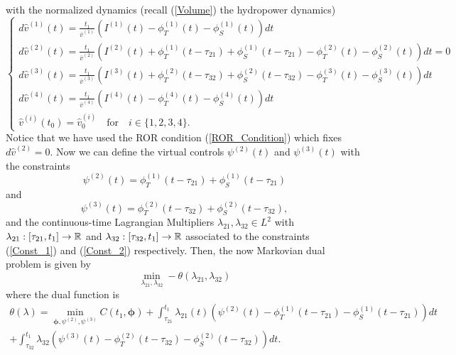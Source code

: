 with the normalized dynamics (recall (\ref{Volume}) the hydropower dynamics)
\begin{equation}
\begin{cases}
d\hat{v}^{(1)}(t)=\frac{t_1}{\overline{v}^{(1)}}\left(I^{(1)}(t)-\phi_T^{(1)}(t)-\phi_S^{(1)}(t)\right)dt\\
d\hat{v}^{(2)}(t)=\frac{t_1}{\overline{v}^{(2)}}\left(I^{(2)}(t)+\phi_T^{(1)}(t-\tau_{21})+\phi_S^{(1)}(t-\tau_{21})-\phi_T^{(2)}(t)-\phi_S^{(2)}(t)\right)dt=0\\
d\hat{v}^{(3)}(t)=\frac{t_1}{\overline{v}^{(3)}}\left(I^{(3)}(t)+\phi_T^{(2)}(t-\tau_{32})+\phi_S^{(2)}(t-\tau_{32})-\phi_T^{(3)}(t)-\phi_S^{(3)}(t)\right)dt\\
d\hat{v}^{(4)}(t)=\frac{t_1}{\overline{v}^{(4)}}\left(I^{(4)}(t)-\phi_T^{(4)}(t)-\phi_S^{(4)}(t)\right)dt\\
\hat{v}^{(i)}(t_0)=\hat{v}_0^{(i)}\quad\text{for}\quad i\in\{1,2,3,4\}.
\end{cases}
\label{Dynamics_Sixth_SP}
\end{equation}
Notice that we have used the ROR condition (\ref{ROR_Condition}) which fixes $d\hat{v}^{(2)}=0$. Now we can define the virtual controls $\psi^{(2)}(t)$ and $\psi^{(3)}(t)$ with the constraints
\begin{equation}
\psi^{(2)}(t)=\phi^{(1)}_T(t-\tau_{21})+\phi^{(1)}_S(t-\tau_{21})
\label{Const_1}
\end{equation}
and
\begin{equation}
\psi^{(3)}(t)=\phi^{(2)}_T(t-\tau_{32})+\phi^{(2)}_S(t-\tau_{32}),
\label{Const_2}
\end{equation}
and the continuous-time Lagrangian Multipliers $\lambda_{21},\lambda_{32}\in L^2$ with $\lambda_{21}:[\tau_{21},t_1]\to\mathbb{R}$ and $\lambda_{32}:[\tau_{32},t_1]\to\mathbb{R}$ associated to the constraints (\ref{Const_1}) and (\ref{Const_2}) respectively. Then, the now Markovian dual problem is given by
\begin{equation}
\min_{\lambda_{21},\lambda_{32}}-\theta(\lambda_{21},\lambda_{32})
\end{equation}
where the dual function is
\begin{multline}
\theta(\lambda)=\min_{\bm{\phi},\psi^{(2)},\psi^{(3)}}C(t_1,\bm{\phi})+\int_{\tau_{21}}^{t_1}\lambda_{21}(t)\left(\psi^{(2)}(t)-\phi^{(1)}_T(t-\tau_{21})-\phi^{(1)}_S(t-\tau_{21})\right)dt\\
+\int_{\tau_{32}}^{t_1}\lambda_{32}\left(\psi^{(3)}(t)-\phi^{(2)}_T(t-\tau_{32})-\phi^{(2)}_S(t-\tau_{32})\right)dt.
\label{Dual_Function_Sixth}
\end{multline}

